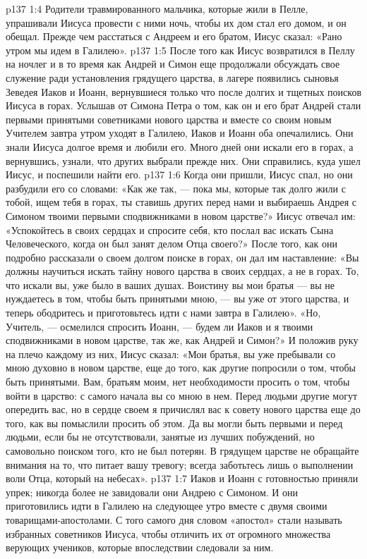 \vs p137 1:4 \pc Родители травмированного мальчика, которые жили в Пелле, упрашивали Иисуса провести с ними ночь, чтобы их дом стал его домом, и он обещал. Прежде чем расстаться с Андреем и его братом, Иисус сказал: «Рано утром мы идем в Галилею».
\vs p137 1:5 \pc После того как Иисус возвратился в Пеллу на ночлег и в то время как Андрей и Симон еще продолжали обсуждать свое служение ради установления грядущего царства, в лагере появились сыновья Зеведея Иаков и Иоанн, вернувшиеся только что после долгих и тщетных поисков Иисуса в горах. Услышав от Симона Петра о том, как он и его брат Андрей стали первыми принятыми советниками нового царства и вместе со своим новым Учителем завтра утром уходят в Галилею, Иаков и Иоанн оба опечалились. Они знали Иисуса долгое время и любили его. Много дней они искали его в горах, а вернувшись, узнали, что других выбрали прежде них. Они справились, куда ушел Иисус, и поспешили найти его.
\vs p137 1:6 Когда они пришли, Иисус спал, но они разбудили его со словами: «Как же так, --- пока мы, которые так долго жили с тобой, ищем тебя в горах, ты ставишь других перед нами и выбираешь Андрея с Симоном твоими первыми сподвижниками в новом царстве?» Иисус отвечал им: «Успокойтесь в своих сердцах и спросите себя, кто послал вас искать Сына Человеческого, когда он был занят делом Отца своего?» После того, как они подробно рассказали о своем долгом поиске в горах, он дал им наставление: «Вы должны научиться искать тайну нового царства в своих сердцах, а не в горах. То, что искали вы, уже было в ваших душах. Воистину вы мои братья --- вы не нуждаетесь в том, чтобы быть принятыми мною, --- вы уже от этого царства, и теперь ободритесь и приготовьтесь идти с нами завтра в Галилею». «Но, Учитель, --- осмелился спросить Иоанн, --- будем ли Иаков и я твоими сподвижниками в новом царстве, так же, как Андрей и Симон?» И положив руку на плечо каждому из них, Иисус сказал: «Мои братья, вы уже пребывали со мною духовно в новом царстве, еще до того, как другие попросили о том, чтобы быть принятыми. Вам, братьям моим, нет необходимости просить о том, чтобы войти в царство: с самого начала вы со мною в нем. Перед людьми другие могут опередить вас, но в сердце своем я причислял вас к совету нового царства еще до того, как вы помыслили просить об этом. Да вы могли быть первыми и перед людьми, если бы не отсутствовали, занятые из лучших побуждений, но самовольно поиском того, кто не был потерян. В грядущем царстве не обращайте внимания на то, что питает вашу тревогу; всегда заботьтесь лишь о выполнении воли Отца, который на небесах».
\vs p137 1:7 Иаков и Иоанн с готовностью приняли упрек; никогда более не завидовали они Андрею с Симоном. И они приготовились идти в Галилею на следующее утро вместе с двумя своими товарищами\hyp{}апостолами. С того самого дня словом «апостол» стали называть избранных советников Иисуса, чтобы отличить их от огромного множества верующих учеников, которые впоследствии следовали за ним.
